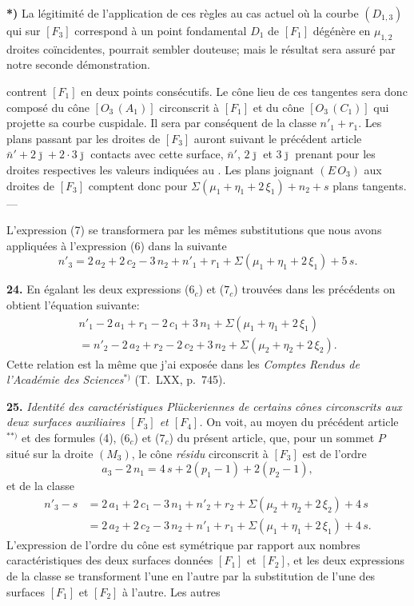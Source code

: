 \documentclass{article}
\begin{document}
\textbf{*)} La légitimité de l'application de ces règles au cas actuel où la courbe $(D_{1, 3})$ qui sur $[F_3]$ correspond à un point fondamental $D_1$ de $[F_1]$ dégénère en $\mu_{1, 2}$ droites coïncidentes, pourrait sembler douteuse; mais le résultat sera assuré par notre seconde démonstration.

contrent $[F_1]$ en deux points consécutifs. Le cône lieu de ces tangentes sera donc composé du cône $[O_3\,(A_1)]$ circonscrit à $[F_1]$ et du cône $[O_3\,(C_1)]$ qui projette sa courbe cuspidale. Il sera par conséquent de la classe $n'_1 + r_1$. Les plans passant par les droites de $[F_3]$ auront suivant le précédent article $\bar{n}' + 2\bar{\jmath} + 2\cdot 3\bar{\jmath}$ contacts avec cette surface, $\bar{n}'$, $2\bar{\jmath}$ et $3\bar{\jmath}$ prenant pour les droites respectives les valeurs indiquées au . Les plans joignant $(E\,O_3)$ aux droites de $[F_3]$ comptent donc pour $\Sigma(\mu_1 + \eta_1 + 2\,\xi_1) + n_2 + s$ plans tangents. ---

L'expression (7) se transformera par les mêmes substitutions que nous avons appliquées à l'expression (6) dans la suivante
\[
n'_3 = 2\,a_2 + 2\,c_2 - 3\,n_2 + n'_1 + r_1 + \Sigma(\mu_1 + \eta_1 + 2\,\xi_1) + 5\,s. \tag{$7_c$}
\]

\textbf{24.} En égalant les deux expressions ($6_c$) et ($7_c$) trouvées dans les \nos précédents on obtient l'équation suivante:
\[
\begin{aligned}
n'_1 - 2\,a_1 + r_1 - 2\,c_1 + 3\,n_1 + \Sigma(\mu_1 + \eta_1 + 2\,\xi_1) \\
= n'_2 - 2\,a_2 + r_2 - 2\,c_2 + 3\,n_2 + \Sigma(\mu_2 + \eta_2 + 2\,\xi_2).
\end{aligned} \tag{II}
\]
Cette relation est la même que j'ai exposée dans les \emph{Comptes Rendus de l'Académie des Sciences}${}^{*)}$ (T.~LXX, p.~745).

\textbf{25.} \emph{Identité des caractéristiques Plückeriennes de certains cônes circonscrits aux deux surfaces auxiliaires $[F_3]$ et $[F_4]$.} On voit, au moyen du précédent article${}^{**)}$ et des formules (4), ($6_c$) et ($7_c$) du présent article, que, pour un sommet $P$ situé sur la droite $(M_3)$, le cône \emph{résidu} circonscrit à $[F_3]$ est de l'ordre
\[
a_3 - 2\,n_1 = 4\,s + 2(p_1 - 1) + 2(p_2 - 1),
\]
et de la classe
\[
\begin{aligned}
n'_3 - s &= 2\,a_1 + 2\,c_1 - 3\,n_1 + n'_2 + r_2 + \Sigma(\mu_2 + \eta_2 + 2\,\xi_2) + 4\,s \\
&= 2\,a_2 + 2\,c_2 - 3\,n_2 + n'_1 + r_1 + \Sigma(\mu_1 + \eta_1 + 2\,\xi_1) + 4\,s.
\end{aligned}
\]
L'expression de l'ordre du cône est symétrique par rapport aux nombres caractéristiques des deux surfaces données $[F_1]$ et $[F_2]$, et les deux expressions de la classe se transforment l'une en l'autre par la substitution de l'une des surfaces $[F_1]$ et $[F_2]$ à l'autre. Les autres
\end{document}
